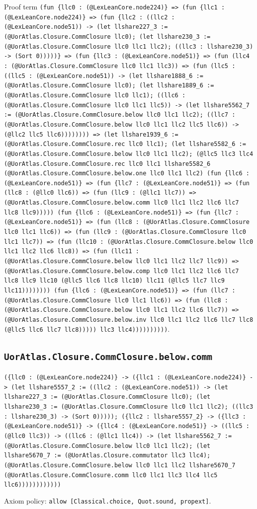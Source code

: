\documentclass[11pt]{article}
\begin{document}
\noindent Proof term \texttt{(fun \{llc0 : (@LexLeanCore.node224)\} => (fun \{llc1 : (@LexLeanCore.node224)\} => (fun \{llc2 : ((llc2 : (@LexLeanCore.node51)) -> (let llshare227\_3 := (@UorAtlas.Closure.CommClosure llc0); (let llshare230\_3 := (@UorAtlas.Closure.CommClosure llc0 llc1 llc2); ((llc3 : llshare230\_3) -> (Sort 0)))))\} => (fun \{llc3 : (@LexLeanCore.node51)\} => (fun (llc4 : (@UorAtlas.Closure.CommClosure llc0 llc1 llc3)) => (fun (llc5 : ((llc5 : (@LexLeanCore.node51)) -> (let llshare1888\_6 := (@UorAtlas.Closure.CommClosure llc0); (let llshare1889\_6 := (@UorAtlas.Closure.CommClosure llc0 llc1); ((llc6 : (@UorAtlas.Closure.CommClosure llc0 llc1 llc5)) -> (let llshare5562\_7 := (@UorAtlas.Closure.CommClosure.below llc0 llc1 llc2); ((llc7 : (@UorAtlas.Closure.CommClosure.below llc0 llc1 llc2 llc5 llc6)) -> (@llc2 llc5 llc6)))))))) => (let llshare1939\_6 := (@UorAtlas.Closure.CommClosure.rec llc0 llc1); (let llshare5582\_6 := (@UorAtlas.Closure.CommClosure.below llc0 llc1 llc2); (@llc5 llc3 llc4 (@UorAtlas.Closure.CommClosure.rec llc0 llc1 llshare5582\_6 (@UorAtlas.Closure.CommClosure.below.one llc0 llc1 llc2) (fun \{llc6 : (@LexLeanCore.node51)\} => (fun \{llc7 : (@LexLeanCore.node51)\} => (fun (llc8 : (@llc0 llc6)) => (fun (llc9 : (@llc1 llc7)) => (@UorAtlas.Closure.CommClosure.below.comm llc0 llc1 llc2 llc6 llc7 llc8 llc9))))) (fun \{llc6 : (@LexLeanCore.node51)\} => (fun \{llc7 : (@LexLeanCore.node51)\} => (fun (llc8 : (@UorAtlas.Closure.CommClosure llc0 llc1 llc6)) => (fun (llc9 : (@UorAtlas.Closure.CommClosure llc0 llc1 llc7)) => (fun (llc10 : (@UorAtlas.Closure.CommClosure.below llc0 llc1 llc2 llc6 llc8)) => (fun (llc11 : (@UorAtlas.Closure.CommClosure.below llc0 llc1 llc2 llc7 llc9)) => (@UorAtlas.Closure.CommClosure.below.comp llc0 llc1 llc2 llc6 llc7 llc8 llc9 llc10 (@llc5 llc6 llc8 llc10) llc11 (@llc5 llc7 llc9 llc11)))))))) (fun \{llc6 : (@LexLeanCore.node51)\} => (fun (llc7 : (@UorAtlas.Closure.CommClosure llc0 llc1 llc6)) => (fun (llc8 : (@UorAtlas.Closure.CommClosure.below llc0 llc1 llc2 llc6 llc7)) => (@UorAtlas.Closure.CommClosure.below.inv llc0 llc1 llc2 llc6 llc7 llc8 (@llc5 llc6 llc7 llc8))))) llc3 llc4))))))))))}.\par
\subsection*{\texttt{UorAtlas.Closure.CommClosure.below.comm}}
\noindent\texttt{(\{llc0 : (@LexLeanCore.node224)\} -> (\{llc1 : (@LexLeanCore.node224)\} -> (let llshare5557\_2 := ((llc2 : (@LexLeanCore.node51)) -> (let llshare227\_3 := (@UorAtlas.Closure.CommClosure llc0); (let llshare230\_3 := (@UorAtlas.Closure.CommClosure llc0 llc1 llc2); ((llc3 : llshare230\_3) -> (Sort 0))))); (\{llc2 : llshare5557\_2\} -> (\{llc3 : (@LexLeanCore.node51)\} -> (\{llc4 : (@LexLeanCore.node51)\} -> ((llc5 : (@llc0 llc3)) -> ((llc6 : (@llc1 llc4)) -> (let llshare5562\_7 := (@UorAtlas.Closure.CommClosure.below llc0 llc1 llc2); (let llshare5670\_7 := (@UorAtlas.Closure.commutator llc3 llc4); (@UorAtlas.Closure.CommClosure.below llc0 llc1 llc2 llshare5670\_7 (@UorAtlas.Closure.CommClosure.comm llc0 llc1 llc3 llc4 llc5 llc6))))))))))))}\par
\noindent Axiom policy: \texttt{allow [Classical.choice, Quot.sound, propext]}.\par
\end{document}
